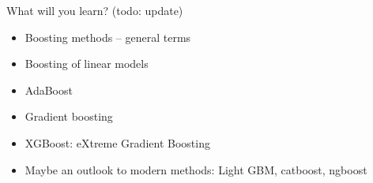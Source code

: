 \documentclass[
  10pt,
  ignorenonframetext,
]{beamer}
\providecommand{\tightlist}{%
  \setlength{\itemsep}{0pt}\setlength{\parskip}{0pt}}
\begin{document}
\begin{frame}
\begin{block}{What will you learn? (todo: update)}
\protect\hypertarget{what-will-you-learn-todo-update}{}
\(~\)

\begin{itemize}
\tightlist
\item
  Boosting methods -- general terms
\end{itemize}

\vspace{2mm}

\begin{itemize}
\tightlist
\item
  Boosting of linear models
\end{itemize}

\vspace{2mm}

\begin{itemize}
\tightlist
\item
  AdaBoost
\end{itemize}

\vspace{2mm}

\begin{itemize}
\tightlist
\item
  Gradient boosting
\end{itemize}

\vspace{2mm}

\begin{itemize}
\tightlist
\item
  XGBoost: eXtreme Gradient Boosting
\end{itemize}

\vspace{2mm}

\begin{itemize}
\tightlist
\item
  Maybe an outlook to modern methods: Light GBM, catboost, ngboost
\end{itemize}
\end{block}
\end{frame}
\end{document}
